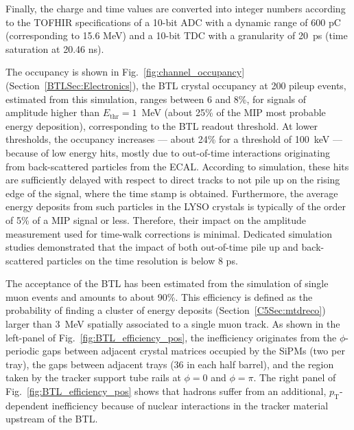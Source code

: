 Finally, the charge and time values are converted into integer numbers according to the TOFHIR specifications 
of a 10-bit ADC with a dynamic range of 600 pC (corresponding to 15.6 MeV) and a 10-bit TDC with a granularity of 20~ps (time saturation at 20.46 ns).

The occupancy is shown in Fig.~\ref{fig:channel_occupancy} (Section~\ref{BTLSec:Electronics}), the BTL crystal occupancy at 200 pileup events, estimated from this simulation, ranges between 6 and 8\%, for signals of amplitude higher than $E_{\text{thr}} = 1$~MeV (about 25\% of the MIP most probable energy deposition), corresponding to the BTL readout threshold. 
At lower thresholds, the occupancy increases --- about 24\% for a threshold of 100~keV --- because of low energy hits, mostly due to out-of-time interactions originating from back-scattered particles from the ECAL. 
According to simulation, these hits are sufficiently delayed with respect to direct tracks to not pile up on the rising edge of the signal, where the time stamp is obtained. 
Furthermore, the average energy deposits from such particles in the LYSO crystals is typically of the order of 5\% of a MIP signal or less. Therefore, their impact on the amplitude measurement used for time-walk corrections is minimal. 
Dedicated simulation studies demonstrated that the impact of both out-of-time pile up and back-scattered particles on the time resolution is below 8 ps.

The acceptance of the BTL has been estimated from the simulation of single muon events and amounts to about 90\%. This efficiency is defined as the probability of finding a cluster of energy deposits (Section~\ref{C5Sec:mtdreco}) larger than 3~MeV spatially associated to a single muon track. 
As shown in the left-panel of Fig.~\ref{fig:BTL_efficiency_pos}, the inefficiency originates from the $\phi$-periodic gaps between adjacent crystal matrices occupied by the SiPMs (two per tray), the gaps between adjacent trays (36 in each half barrel), and the region taken by the tracker support tube rails at $\phi = 0$ and $\phi = \pi$.  
The right panel of Fig.~\ref{fig:BTL_efficiency_pos} shows that hadrons suffer from an additional, $p_{\text{T}}$-dependent inefficiency because of nuclear interactions in the tracker material upstream of the BTL.

